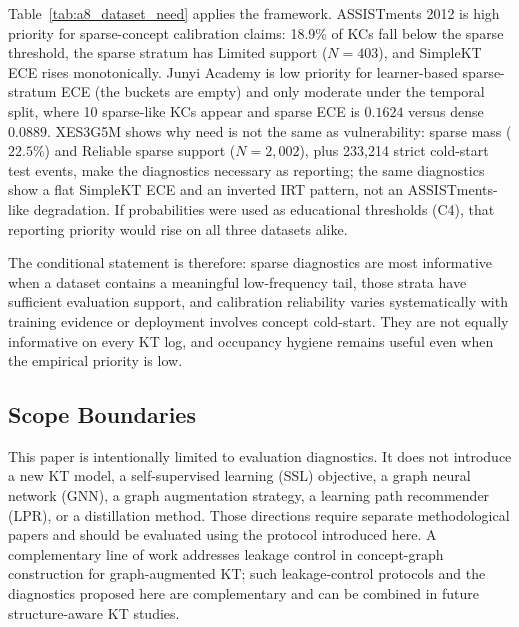 Table~\ref{tab:a8_dataset_need} applies the framework. ASSISTments 2012 is high priority for sparse-concept calibration claims: 18.9\% of KCs fall below the sparse threshold, the sparse stratum has Limited support ($N=403$), and SimpleKT ECE rises monotonically. Junyi Academy is low priority for learner-based sparse-stratum ECE (the buckets are empty) and only moderate under the temporal split, where 10 sparse-like KCs appear and sparse ECE is $0.1624$ versus dense $0.0889$. XES3G5M shows why need is not the same as vulnerability: sparse mass ($22.5\%$) and Reliable sparse support ($N=2{,}002$), plus 233{,}214 strict cold-start test events, make the diagnostics necessary as reporting; the same diagnostics show a flat SimpleKT ECE and an inverted IRT pattern, not an ASSISTments-like degradation. If probabilities were used as educational thresholds (C4), that reporting priority would rise on all three datasets alike.

The conditional statement is therefore: sparse diagnostics are most informative when a dataset contains a meaningful low-frequency tail, those strata have sufficient evaluation support, and calibration reliability varies systematically with training evidence or deployment involves concept cold-start. They are not equally informative on every KT log, and occupancy hygiene remains useful even when the empirical priority is low.

\subsection{Scope Boundaries}
This paper is intentionally limited to evaluation diagnostics. It does not introduce a new KT model, a self-supervised learning (SSL) objective, a graph neural network (GNN), a graph augmentation strategy, a learning path recommender (LPR), or a distillation method. Those directions require separate methodological papers and should be evaluated using the protocol introduced here. A complementary line of work addresses leakage control in concept-graph construction for graph-augmented KT; such leakage-control protocols and the diagnostics proposed here are complementary and can be combined in future structure-aware KT studies.


